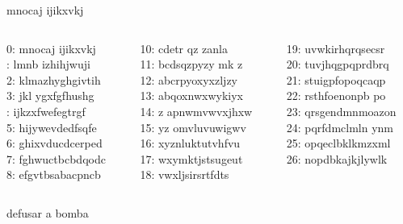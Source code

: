 \begin{frame}{}{}
\begin{center}
mnocaj ijikxvkj\ppause
\end{center}
\begin{columns}[t]\small
\begin{column}{0.33\textwidth}
0: mnocaj ijikxvkj\\: lmnb izhihjwuji\\
2: klmazhyghgivtih\\
3: jkl ygxfgfhushg\\: ijkzxfwefegtrgf\\
5: hijywevdedfsqfe\\
6: ghixvducdcerped\\
7: fghwuctbcbdqodc\\
8: efgvtbsabacpncb\\
\end{column}
\begin{column}{0.33\textwidth}
10: cdetr qz zanla \\
11: bcdsqzpyzy mk z\\
12: abcrpyoxyxzljzy\\
13:  abqoxnwxwykiyx\\
14: z apnwmvwvxjhxw\\
15: yz omvluvuwigwv\\
16: xyznluktutvhfvu\\
17: wxymktjstsugeut\\
18: vwxljsirsrtfdts\\
\end{column}
\begin{column}{0.33\textwidth}
19: uvwkirhqrqsecsr\\
20: tuvjhqgpqprdbrq\\
21: stuigpfopoqcaqp\\
22: rsthfoenonpb po\\
23: qrsgendmnmoazon\\
24: pqrfdmclmln ynm\\
25: opqeclbklkmzxml\\
26: nopdbkajkjlywlk\\\ppause
\end{column}
\end{columns}
\begin{center}
\ppause
defusar a bomba
\end{center}
\end{frame}




